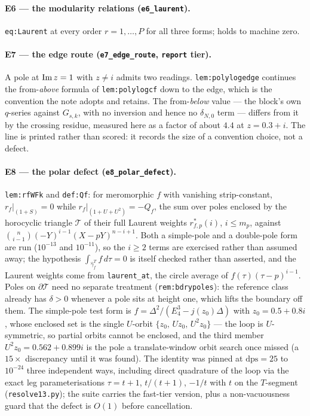 \documentclass[11pt]{article}
\newcommand{\code}[1]{\texttt{#1}}
\begin{document}
\paragraph{E6 --- the modularity relations (\code{e6\_laurent}).}
\code{eq:Laurent} at every order $r=1,\dots,P$ for all three forms; holds to machine zero.

\paragraph{E7 --- the edge route (\code{e7\_edge\_route}, \code{report} tier).}
A pole at ${\rm Im}\,z=1$ with $z\neq i$ admits two readings. \code{lem:polylogedge} continues
the from-\emph{above} formula of \code{lem:polylogcf} down to the edge, which is the convention
the note adopts and retains. The from-\emph{below} value --- the block's own $q$-series against
$G_{s,k}$, with no inversion and hence no $\delta_{N,0}$ term --- differs from it by the
crossing residue, measured here as a factor of about $4.4$ at $z=0.3+i$. The line is printed
rather than scored: it records the size of a convention choice, not a defect.

\paragraph{E8 --- the polar defect (\code{e8\_polar\_defect}).}
\code{lem:rfWFk} and \code{def:Qf}: for meromorphic $f$ with vanishing strip-constant,
$r_f|_{(1+S)}=0$ while $r_f|_{(1+U+U^2)}=-Q_f$, the sum over poles enclosed by the horocyclic
triangle $\mathcal T$ of their full Laurent weights $r^*_{f,p}(i)$, $i\le m_p$, against
$\binom{n}{i-1}(-Y)^{i-1}(X-pY)^{n-i+1}$. Both a simple-pole and a double-pole form are run
($10^{-13}$ and $10^{-11}$), so the $i\ge2$ terms are exercised rather than assumed away; the
hypothesis $\int_{\hat\gamma^T_f}f\,d\tau=0$ is itself checked rather than asserted, and the
Laurent weights come from \code{laurent\_at}, the circle average of $f(\tau)(\tau-p)^{i-1}$.
Poles on $\partial\mathcal T$ need no separate treatment (\code{rem:bdrypoles}): the reference
class already has $\delta>0$ whenever a pole sits at height one, which lifts the boundary off
them. The simple-pole test form is
$f=\Delta^2/(E_4^3-j(z_0)\Delta)$ with $z_0=0.5+0.8i$, whose enclosed set is the single
$U$-orbit $\{z_0,\,Uz_0,\,U^2z_0\}$ --- the loop is $U$-symmetric, so partial orbits cannot be
enclosed, and the third member $U^2z_0=0.562+0.899i$ is the pole a translate-window orbit
search once missed (a $15\times$ discrepancy until it was found). The identity was pinned at
$\mathrm{dps}=25$ to $10^{-24}$ three independent ways, including direct quadrature of the
loop via the exact leg parameterisations $\tau=t{+}1$, $t/(t{+}1)$, $-1/t$ with $t$ on the
$T$-segment (\code{resolve13.py}); the suite carries the fast-tier version, plus a
non-vacuousness guard that the defect is $O(1)$ before cancellation.
\end{document}
